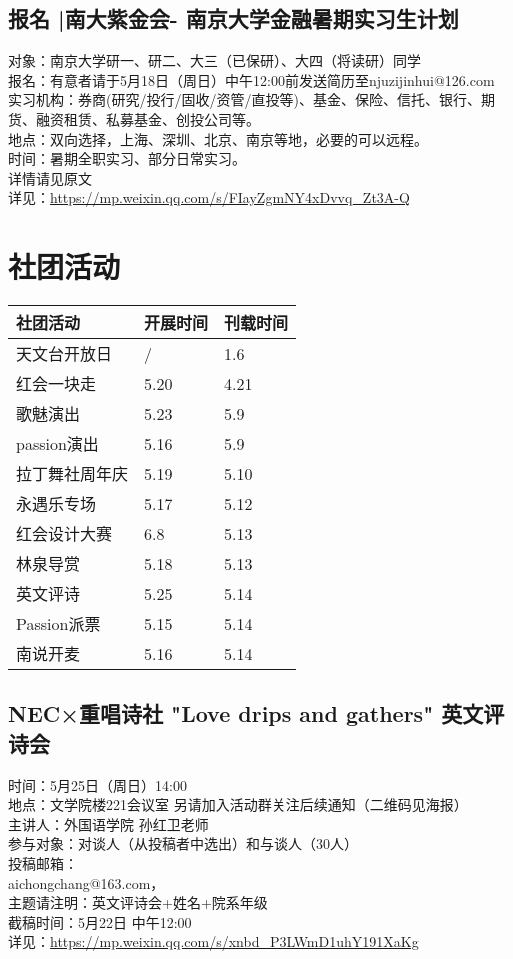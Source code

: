 \documentclass[letterpaper, 12pt]{article}
\begin{document}
\begin{multicols}{2}
\subsection{报名 |南大紫金会- 南京大学金融暑期实习生计划} %
对象：南京大学研一、研二、大三（已保研）、大四（将读研）同学
\\报名：有意者请于5月18日（周日）中午12:00前发送简历至njuzijinhui@126.com
\\实习机构：券商(研究/投行/固收/资管/直投等)、基金、保险、信托、银行、期货、融资租赁、私募基金、创投公司等。
\\地点：双向选择，上海、深圳、北京、南京等地，必要的可以远程。
\\时间：暑期全职实习、部分日常实习。
\\详情请见原文
\\详见：\url{https://mp.weixin.qq.com/s/FIayZgmNY4xDvvq_Zt3A-Q}

\section{社团活动}
\begin{tabular}{|>{\centering\arraybackslash}m{}|m{}|m{}|}
    \hline
    社团活动 & 开展时间 & 刊载时间\\
    \hline\hline
    天文台开放日 & / & 1.6\\
    红会一块走 & 5.20 & 4.21\\
    歌魅演出 & 5.23 & 5.9\\
    passion演出 & 5.16 & 5.9\\
    拉丁舞社周年庆 & 5.19 & 5.10\\
    永遇乐专场 & 5.17 & 5.12\\
    红会设计大赛 & 6.8 & 5.13\\
    林泉导赏 & 5.18 & 5.13\\
    英文评诗 & 5.25 & 5.14\\
    Passion派票 & 5.15 & 5.14\\
    南说开麦 & 5.16 & 5.14\\
    \hline
\end{tabular}
\subsection{NEC×重唱诗社 "Love drips and gathers" 英文评诗会} %
时间：5月25日（周日）14:00
\\地点：文学院楼221会议室 另请加入活动群关注后续通知（二维码见海报）
\\主讲人：外国语学院 孙红卫老师
\\参与对象：对谈人（从投稿者中选出）和与谈人（30人）
\\投稿邮箱：
\\aichongchang@163.com，
\\主题请注明：英文评诗会+姓名+院系年级
\\截稿时间：5月22日 中午12:00
\\详见：\url{https://mp.weixin.qq.com/s/xnbd_P3LWmD1uhY191XaKg}


\end{multicols}
\end{document}
